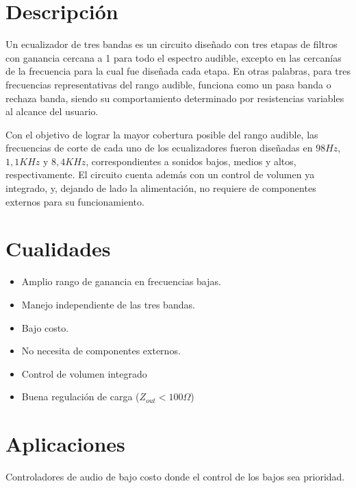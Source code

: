 \documentclass[a4paper,12pt,oneside,pdflatex,italian,final,twocolumn]{article}
\begin{document}
\begin{minipage}{0.47\textwidth}
  \section{Descripción}
  Un ecualizador de tres bandas es un circuito diseñado con tres etapas de filtros con ganancia cercana a 1 para todo el espectro audible, excepto en las cercanías de la 
  frecuencia para la cual fue diseñada cada etapa.
  En otras palabras, para tres frecuencias representativas del rango audible, funciona como un pasa banda o rechaza banda, siendo su comportamiento determinado por 
  resistencias variables al alcance del usuario.\par
  Con el objetivo de lograr la mayor cobertura posible del rango audible, las frecuencias de corte de cada uno de los ecualizadores fueron diseñadas en $98 Hz$, $1,1 KHz$ y $8,4 KHz$,
  correspondientes a sonidos bajos, medios y altos, respectivamente.
  El circuito cuenta además con un control de volumen ya integrado, y, dejando de lado la alimentación, no requiere de componentes externos para su funcionamiento. \\
\end{minipage}
\hfill
\begin{minipage}{0.47\textwidth}
  \section{Cualidades}
  \begin{itemize}
    \item Amplio rango de ganancia en frecuencias bajas.
    \item Manejo independiente de las tres bandas.
    \item Bajo costo.
    \item No necesita de componentes externos.
    \item Control de volumen integrado
    \item Buena regulación de carga ($Z_{out} < 100 \Omega$)
  \end{itemize}
    
  \section{Aplicaciones}
  Controladores de audio de bajo costo donde el control de los bajos sea prioridad.

\end{minipage}
\end{document}
